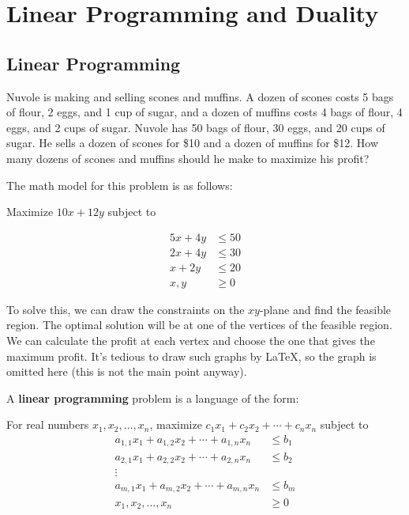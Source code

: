 \chapter {Linear Programming and Duality}

\section {Linear Programming}

\begin{problem}
Nuvole is making and selling scones and muffins. A dozen of scones costs 5 bags of flour, 2 eggs, and 1 cup of sugar, and a dozen of muffins costs 4 bags of flour, 4 eggs, and 2 cups of sugar. Nuvole has 50 bags of flour, 30 eggs, and 20 cups of sugar. He sells a dozen of scones for \$10 and a dozen of muffins for \$12. How many dozens of scones and muffins should he make to maximize his profit?
\end{problem}

The math model for this problem is as follows:

Maximize $10x + 12y$ subject to

\begin{align*}
	5x + 4y & \leq 50 \\
	2x + 4y & \leq 30 \\
	x + 2y  & \leq 20 \\
	x, y    & \geq 0
\end{align*}

To solve this, we can draw the constraints on the $xy$-plane and find the feasible region. The optimal solution will be at one of the vertices of the feasible region. We can calculate the profit at each vertex and choose the one that gives the maximum profit. It's tedious to draw such graphs by LaTeX, so the graph is omitted here (this is not the main point anyway).

\begin{definition}
	A \textbf{linear programming} problem is a language of the form:

	For real numbers $x_1, x_2, \ldots, x_n$, maximize $c_1 x_1 + c_2 x_2 + \cdots + c_n x_n$ subject to
	\begin{align*}
		a_{1,1} x_1 + a_{1,2} x_2 + \cdots + a_{1,n} x_n & \leq b_1 \\
		a_{2,1} x_1 + a_{2,2} x_2 + \cdots + a_{2,n} x_n & \leq b_2 \\
		\vdots                                           &          \\
		a_{m,1} x_1 + a_{m,2} x_2 + \cdots + a_{m,n} x_n & \leq b_m \\
		x_1, x_2, \ldots, x_n                            & \geq 0
	\end{align*}
\end{definition}

